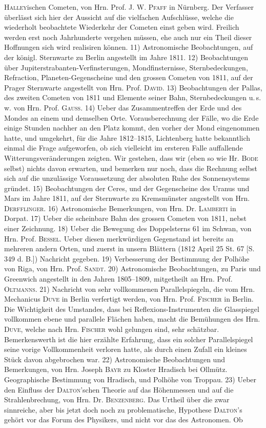 \textsc{Halley}ischen Cometen, von Hrn. Prof. J. W. \textsc{Pfaff} in Nürnberg. Der Verfasser überlässt sich hier der Aussicht auf die vielfachen Aufschlüsse, welche die wiederholt beobachtete Wiederkehr der Cometen einst geben wird. Freilich werden erst noch Jahrhunderte vergehen müssen, ehe auch nur ein Theil dieser Hoffnungen sich wird realisiren können. 11) Astronomische Beobachtungen, auf der königl. Sternwarte zu Berlin angestellt im Jahre 1811. 12) Beobachtungen über Jupiterstrabanten-Verfinsterungen, Mondfinsternisse, Sternbedeckungen, Refraction, Planeten-Gegenscheine und den grossen Cometen von 1811, auf der Prager Sternwarte angestellt von Hrn. Prof. \textsc{David}. 13) Beobachtungen der Pallas, des zweiten Cometen von 1811 und Elemente seiner Bahn, Sternbedeckungen u.\,s.\,w. von Hrn. Prof. \textsc{Gauss}. 14) Ueber das Zusammentreffen der Erde und des Mondes an einem und demselben Orte. Vorausberechnung der Fälle, wo die Erde einige Stunden nachher an den Platz kommt, den vorher der Mond eingenommen hatte, und umgekehrt, für die Jahre 1812--1815, Lichtenberg hatte bekanntlich einmal die Frage aufgeworfen, ob sich vielleicht im ersteren Falle auffallende Witterungsveränderungen zeigten. Wir gestehen, dass wir (eben so wie Hr. \textsc{Bode} selbst) nichts davon erwarten, und bemerken nur noch, dass die Rechnung selbst sich auf die unzulässige Voraussetzung der absoluten Ruhe des Sonnensystems gründet. 15) Beobachtungen der Ceres, und der Gegenscheine des Uranus und Mars im Jahre 1811, auf der Sternwarte zu Kremsmünster angestellt von Hrn. \textsc{Derfflinger}. 16) Astronomische Bemerkungen, von Hrn. Dr. \textsc{Lamberti} in Dorpat. 17) Ueber die scheinbare Bahn des grossen Cometen von 1811, nebst einer Zeichnung. 18) Ueber die Bewegung des Doppelsterns 61 im Schwan, von Hrn. Prof. \textsc{Bessel}. Ueber diesen merkwürdigen Gegenstand ist bereits an mehreren andern Orten, und zuerst in unsern Blättern (1812 April 25 St. 67 [S. 349 d. B.]) Nachricht gegeben. 19) Verbesserung der Bestimmung der Polhöhe von Riga, von Hrn. Prof. \textsc{Sandt}. 20) Astronomische Beobachtungen, zu Paris und Greenwich angestellt in den Jahren 1805--1809, mitgetheilt an Hrn. Prof. \textsc{Oltmanns}. 21) Nachricht von sehr vollkommenen Parallelspiegeln, die vom Hrn. Mechanicus \textsc{Duve} in Berlin verfertigt werden, von Hrn. Prof. \textsc{Fischer} in Berlin. Die Wichtigkeit des Umstandes, dass bei Reflexions-Instrumenten die Glasspiegel vollkommen ebene und parallele Flächen haben, macht die Bemühungen des Hrn. \textsc{Duve}, welche nach Hrn. \textsc{Fischer} wohl gelungen sind, sehr schätzbar. Bemerkenswerth ist die hier erzählte Erfahrung, dass ein solcher Parallelspiegel seine vorige Vollkommenheit verloren hatte, als durch einen Zufall ein kleines Stück davon abgebrochen war. 22) Astronomische Beobachtungen und Bemerkungen, von Hrn. Joseph \textsc{Bayr} zu Kloster Hradisch bei Ollmütz. Geographische Bestimmung von Hradisch, und Polhöhe von Troppau. 23) Ueber den Einfluss der \textsc{Dalton}'schen Theorie auf das Höhenmessen und auf die Strahlenbrechung, von Hrn. Dr. \textsc{Benzenberg}. Das Urtheil über die zwar sinnreiche, aber bis jetzt doch noch zu problematische, Hypothese \textsc{Dalton}'s gehört vor das Forum des Physikers, und nicht vor das des Astronomen. Ob 